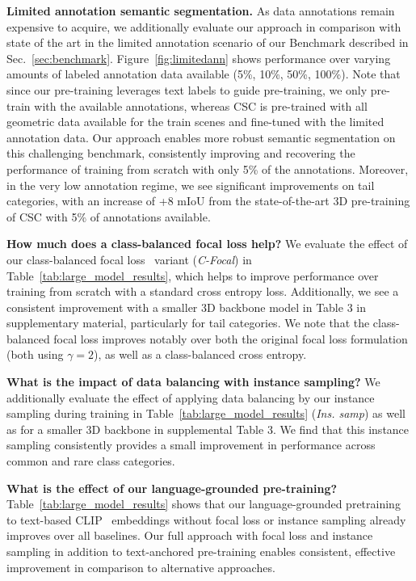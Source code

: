 \smallskip
\noindent \textbf{Limited annotation semantic segmentation.}
As data annotations remain expensive to acquire, we additionally evaluate our approach in comparison with state of the art in the limited annotation scenario of our \OURS{} Benchmark described in Sec.~\ref{sec:benchmark}.
Figure~\ref{fig:limitedann} shows performance over varying amounts of labeled annotation data available (5\%, 10\%, 50\%, 100\%).
Note that since our pre-training leverages text labels to guide pre-training, we only pre-train with the available annotations, whereas CSC is pre-trained with all geometric data available for the train scenes and fine-tuned with the limited annotation data.
Our approach enables more robust semantic segmentation on this challenging benchmark, consistently improving and recovering the performance of training from scratch with only 5\% of the annotations. Moreover, in the very low annotation regime, we see significant improvements on tail categories, with an increase of +8 mIoU from the state-of-the-art 3D pre-training of CSC with 5\% of annotations available.


\smallskip
\noindent \textbf{How much does a class-balanced focal loss help?}
We evaluate the effect of our class-balanced  focal loss~\cite{focalloss} variant (\emph{C-Focal}) in Table~\ref{tab:large_model_results}, which helps to improve performance over training from scratch with a standard cross entropy loss.
Additionally, we see a consistent improvement with a smaller 3D backbone model in Table 3 in supplementary material, particularly for tail categories. We note that the class-balanced focal loss improves notably over both the original focal loss formulation (both using $\gamma = 2$), as well as a class-balanced cross entropy.

\smallskip
\noindent \textbf{What is the impact of data balancing with instance sampling?}
We additionally evaluate the effect of applying data balancing by our instance sampling during training in Table~\ref{tab:large_model_results} (\emph{Ins. samp}) as well as for a smaller 3D backbone in supplemental Table 3. 
We find that this instance sampling consistently provides a small improvement in performance across common and rare class categories.

\smallskip
\noindent \textbf{What is the effect of our language-grounded pre-training?}
Table~\ref{tab:large_model_results} shows that our language-grounded pretraining to text-based CLIP~\cite{clip} embeddings without focal loss or instance sampling already improves over all baselines.
Our full approach with focal loss and instance sampling in addition to text-anchored pre-training enables consistent, effective improvement in comparison to alternative approaches.

